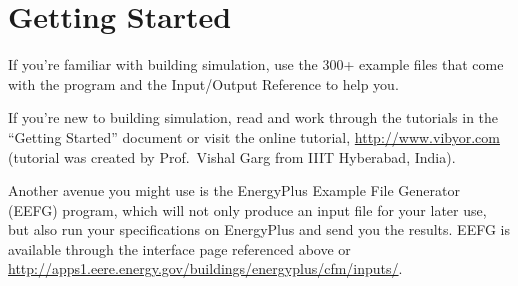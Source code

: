 \section{Getting Started}\label{getting-started}

If you're familiar with building simulation, use the 300+ example files that come with the program and the Input/Output Reference to help you.

If you're new to building simulation, read and work through the tutorials in the ``Getting Started'' document or visit the online tutorial, \url{http://www.vibyor.com} (tutorial was created by Prof.~Vishal Garg from IIIT Hyberabad, India).

Another avenue you might use is the EnergyPlus Example File Generator (EEFG) program, which will not only produce an input file for your later use, but also run your specifications on EnergyPlus and send you the results. EEFG is available through the interface page referenced above or \url{http://apps1.eere.energy.gov/buildings/energyplus/cfm/inputs/}.
